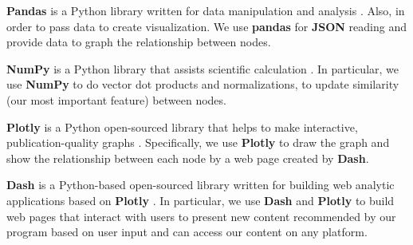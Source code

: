 \documentclass[fontsize=11pt]{article}
\begin{document}
\begin{enumerate}
    \quad \textbf{Pandas} is a Python library written for data manipulation and analysis \citep{Pan21}. Also, in order to pass data to create visualization. We use \textbf{pandas} for \textbf{JSON} reading and provide data to graph the relationship between nodes.
    
    \quad \textbf{NumPy} is a Python library that assists scientific calculation \citep{Pynpy}. In particular, we use \textbf{NumPy} to do vector dot products and normalizations, to update similarity (our most important feature) between nodes.
    
    \quad \textbf{Plotly} is a Python open-sourced library that helps to make interactive, publication-quality graphs \citep{plotly}. Specifically, we use \textbf{Plotly} to draw the graph and show the relationship between each node by a web page created by \textbf{Dash}.
    
    \quad \textbf{Dash} is a Python-based open-sourced library written for building web analytic applications based on \textbf{Plotly} \citep{Dash21}. In particular, we use \textbf{Dash} and \textbf{Plotly} to build web pages that interact with users to present new content recommended by our program based on user input and can access our content on any platform.
    
\end{enumerate}



\end{document}

